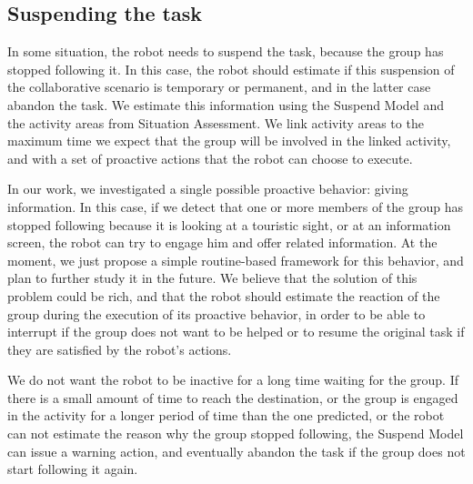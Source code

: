 \subsection{Suspending the task}
In some situation, the robot needs to suspend the task, because the group has stopped following it. In this case, the robot should estimate if this suspension of the collaborative scenario is temporary or permanent, and in the latter case abandon the task. We estimate this information using the Suspend Model and the activity areas from Situation Assessment. We link activity areas to the maximum time we expect that the group will be involved in the linked activity, and with a set of proactive actions that the robot can choose to execute.

In our work, we investigated a single possible proactive behavior: giving information. In this case, if we detect that one or more  members
of the group has stopped following because it is looking at a touristic sight, or at an information screen, the robot can try to engage him and offer related information. At the moment, we just propose a simple routine-based framework for this behavior, and plan to further study it in the future. We believe that the solution of this problem could be rich, and that the robot should estimate the reaction of the group during the execution of its proactive behavior, in order to be able to interrupt if the group does not want to be helped or to resume the original task if they are satisfied by the robot's actions.

We do not want the robot to be inactive for a long time  waiting for the group. If there is a small amount of time to reach the destination, or the group is engaged in the activity for a longer period of time than the one predicted, or the robot can not estimate the reason why the group stopped following, the Suspend Model can issue a warning action, and eventually abandon the task if the group does not start following it again.



